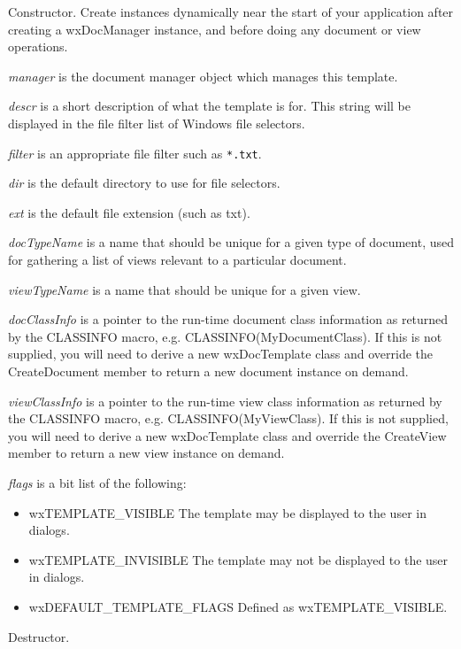 Constructor. Create instances dynamically near the start of your application after creating
a wxDocManager instance, and before doing any document or view operations.

{\it manager} is the document manager object which manages this template.

{\it descr} is a short description of what the template is for. This string will be displayed in the
file filter list of Windows file selectors.

{\it filter} is an appropriate file filter such as \verb$*.txt$.

{\it dir} is the default directory to use for file selectors.

{\it ext} is the default file extension (such as txt).

{\it docTypeName} is a name that should be unique for a given type of document, used for
gathering a list of views relevant to a particular document.

{\it viewTypeName} is a name that should be unique for a given view.

{\it docClassInfo} is a pointer to the run-time document class information as returned
by the CLASSINFO macro, e.g. CLASSINFO(MyDocumentClass). If this is not supplied,
you will need to derive a new wxDocTemplate class and override the CreateDocument
member to return a new document instance on demand.

{\it viewClassInfo} is a pointer to the run-time view class information as returned
by the CLASSINFO macro, e.g. CLASSINFO(MyViewClass). If this is not supplied,
you will need to derive a new wxDocTemplate class and override the CreateView
member to return a new view instance on demand.

{\it flags} is a bit list of the following:

\begin{itemize}\itemsep=0pt
\item wxTEMPLATE\_VISIBLE The template may be displayed to the user in dialogs.
\item wxTEMPLATE\_INVISIBLE The template may not be displayed to the user in dialogs.
\item wxDEFAULT\_TEMPLATE\_FLAGS Defined as wxTEMPLATE\_VISIBLE.
\end{itemize}



Destructor.

